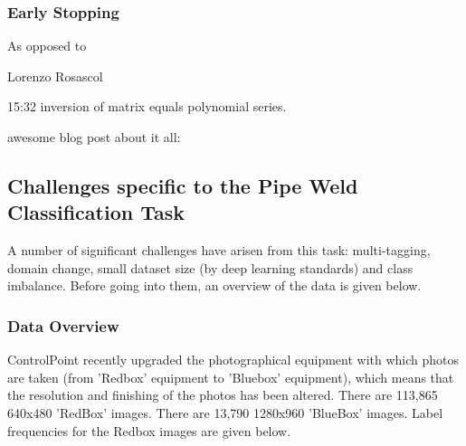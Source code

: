 \documentclass[a4paper,11pt]{article}
\begin{document}
\subsubsection{Early Stopping}

As opposed to 

Lorenzo Rosascol %

15:32 inversion of matrix equals polynomial series.

awesome blog post about it all: %




\subsection{Challenges specific to the Pipe Weld Classification Task}

A number of significant challenges have arisen from this task: multi-tagging, domain change, small dataset size (by deep learning standards) and class imbalance. Before going into them, an overview of the data is given below. \\

\subsubsection{Data Overview}


ControlPoint recently upgraded the photographical equipment with which photos are taken (from 'Redbox' equipment to 'Bluebox' equipment), which means that the resolution and finishing of the photos has been altered. There are 113,865 640x480 'RedBox' images. There are 13,790 1280x960 'BlueBox' images. Label frequencies for the Redbox images are given below.
\end{document}
